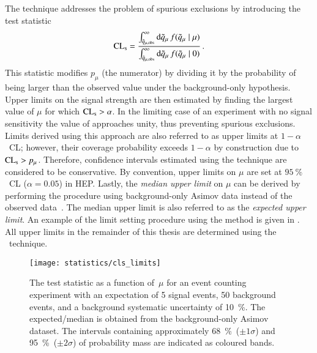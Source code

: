The \CLs technique addresses the problem of spurious exclusions by introducing
the test statistic~\cite{Cowan:2010js}
\begin{align*}
  \text{CL}_{\text{s}} = \frac
  {\int_{\tilde{q}_{\mu, \text{obs}}}^{\infty} \mathrm{d}\tilde{q}_{\mu} \, f(\tilde{q}_{\mu} \mid \mu)}
  {\int_{\tilde{q}_{\mu, \text{obs}}}^\infty \mathrm{d}\tilde{q}_{\mu} \, f(\tilde{q}_{\mu} \mid 0)} \,\text{.}
\end{align*}
This statistic modifies $p_\mu$ (the numerator) by dividing it by the
probability of \qmutilde being larger than the observed value under the
background-only hypothesis. Upper limits on the signal strength are then
estimated by finding the largest value of $\mu$ for which $\text{CL}_{\text{s}} > \alpha$. In
the limiting case of an experiment with no signal sensitivity the value of \CLs
approaches unity, thus preventing spurious exclusions. Limits derived using this
approach are also referred to as upper limits at $1 - \alpha$~CL; however, their
coverage probability exceeds $1 - \alpha$ by construction due to $\text{CL}_{\text{s}} >
p_\mu$. Therefore, confidence intervals estimated using the \CLs technique are
considered to be conservative. By convention, upper limits on $\mu$ are set at
$\SI{95}{\percent}$~CL ($\alpha = 0.05$) in HEP. Lastly, the \emph{median upper
  limit} on $\mu$ can be derived by performing the procedure using
background-only Asimov data instead of the observed
data~\cite{Cowan:2010js}. The median upper limit is also referred to as the
\emph{expected upper limit}. An example of the limit setting procedure using the
\CLs method is given in . All upper limits in the
remainder of this thesis are determined using the \CLs~technique.

\begin{figure}[htbp]
  \centering

  \texttt{[image: statistics/cls\_limits]}

  \caption[The \CLs test statistic as a function of $\mu$ for an event counting
  experiment.]{The \CLs test statistic as a function of~$\mu$ for an event
    counting experiment with an expectation of 5 signal events, 50 background
    events, and a background systematic uncertainty of \SI{10}{\percent}. The
    expected/median \CLs is obtained from the background-only Asimov
    dataset. The \CLs intervals containing approximately
    \SI{68}{\percent}~($\pm 1 \sigma$) and \SI{95}{\percent}~($\pm 2 \sigma$) of
    probability mass are indicated as coloured bands.}%
  \label{fig:cls_example}
\end{figure}

